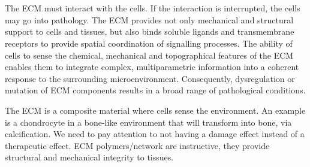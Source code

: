 \\
\\
\noindent
The ECM must interact with the cells. If the interaction is interrupted, the cells may go into pathology.  
The ECM provides not only mechanical and structural support to cells and tissues, but also binds soluble ligands and transmembrane receptors to provide spatial coordination of signalling processes. 
The ability of cells to sense the chemical, mechanical and topographical features of the ECM enables them to integrate complex, multiparametric information into a coherent response to the surrounding microenvironment. 
Consequently, dysregulation or mutation of ECM components results in a broad range of pathological conditions.

The ECM is a composite material where cells sense the environment. 
An example is a chondrocyte in a bone-like environment that will transform into bone, via calcification.
We need to pay attention to not having a damage effect instead of a therapeutic effect.  
ECM polymers/network are instructive,  they provide structural and mechanical integrity to tissues.  

